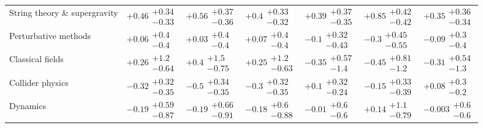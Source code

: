 \begin{table}[H]
\begin{tabular}{lllllll}
String theory \& supergravity             &  $\bm{+0.46}\substack{+0.34 \\ -0.33}$ &  $\bm{+0.56}\substack{+0.37 \\ -0.36}$ &   $\bm{+0.4}\substack{+0.33 \\ -0.32}$ &  $\bm{+0.39}\substack{+0.37 \\ -0.35}$ &  $\bm{+0.85}\substack{+0.42 \\ -0.42}$ &  $\bm{+0.35}\substack{+0.36 \\ -0.34}$ \\
Perturbative methods                      &         $+0.06\substack{+0.4 \\ -0.4}$ &         $+0.03\substack{+0.4 \\ -0.4}$ &         $+0.07\substack{+0.4 \\ -0.4}$ &        $-0.1\substack{+0.32 \\ -0.43}$ &        $-0.3\substack{+0.45 \\ -0.55}$ &         $-0.09\substack{+0.3 \\ -0.4}$ \\
Classical fields                          &        $+0.26\substack{+1.2 \\ -0.64}$ &         $+0.4\substack{+1.5 \\ -0.75}$ &        $+0.25\substack{+1.2 \\ -0.63}$ &        $-0.35\substack{+0.57 \\ -1.4}$ &        $-0.45\substack{+0.81 \\ -1.2}$ &        $-0.31\substack{+0.54 \\ -1.3}$ \\
Collider physics                          &       $-0.32\substack{+0.32 \\ -0.35}$ &   $\bm{-0.5}\substack{+0.34 \\ -0.35}$ &        $-0.3\substack{+0.32 \\ -0.35}$ &        $+0.1\substack{+0.32 \\ -0.24}$ &       $-0.15\substack{+0.33 \\ -0.39}$ &         $+0.08\substack{+0.3 \\ -0.2}$ \\
Dynamics                                  &       $-0.19\substack{+0.59 \\ -0.87}$ &       $-0.19\substack{+0.66 \\ -0.91}$ &        $-0.18\substack{+0.6 \\ -0.88}$ &         $-0.01\substack{+0.6 \\ -0.6}$ &        $+0.14\substack{+1.1 \\ -0.79}$ &        $-0.003\substack{+0.6 \\ -0.6}$ \\

\end{tabular}
\end{table}
